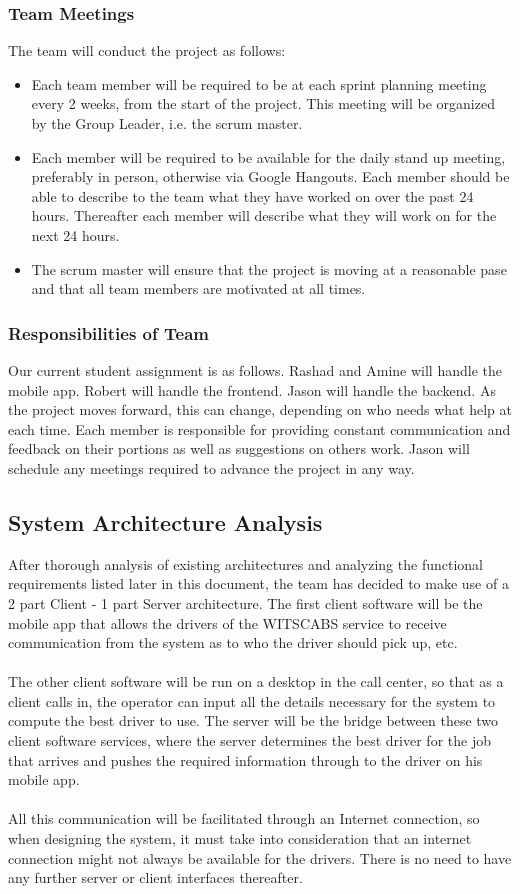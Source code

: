 \documentclass[a4paper,12pt]{article}
\begin{document}
\subsubsection{Team Meetings}
The team will conduct the project as follows:
\begin{itemize}
\setlength\itemsep{0em}
\item [] Each team member will be required to be at each sprint planning meeting every 2 weeks, from the start of the project. This meeting will be organized by the Group Leader, i.e. the scrum master.
\item [] Each member will be required to be available for the daily stand up meeting, preferably in person, otherwise via Google Hangouts. Each member should be able to describe to the team what they have worked on over the past 24 hours. Thereafter each member will describe what they will work on for the next 24 hours. 
\item [] The scrum master will ensure that the project is moving at a reasonable pase and that all team members are motivated at all times.
\end{itemize}
\subsubsection{Responsibilities of Team}
Our current student assignment is as follows. Rashad and Amine will handle the mobile app. Robert will handle the frontend. Jason will handle the backend. As the project moves forward, this can change, depending on who needs what help at each time. Each member is responsible for providing constant communication and feedback on their portions as well as suggestions on others work. Jason will schedule any meetings required to advance the project in any way.
\subsection{System Architecture Analysis}
After thorough analysis of existing architectures and analyzing the functional requirements listed later in this document, the team has decided to make use of a 2 part Client - 1 part Server architecture. The first client software will be the mobile app that allows the drivers of the WITSCABS service to receive communication from the system as to who the driver should pick up, etc. \\\\The other client software will be run on a desktop in the call center, so that as a client calls in, the operator can input all the details necessary for the system to compute the best driver to use. The server will be the bridge between these two client software services, where the server determines the best driver for the job that arrives and pushes the required information through to the driver on his mobile app.\\\\ All this communication will be facilitated through an Internet connection, so when designing the system, it must take into consideration that an internet connection might not always be available for the drivers. There is no need to have any further server or client interfaces thereafter.
\end{document}

